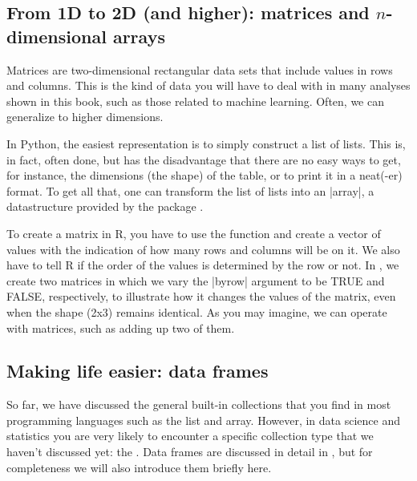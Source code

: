 \subsection{From 1D to 2D (and higher): matrices and $n$-dimensional arrays}

Matrices are two-dimensional rectangular data sets that include values
in rows and columns. This is the kind of data you will have to deal
with in many analyses shown in this book, such as those related to
machine learning. Often, we can generalize to higher dimensions.


In Python, the easiest representation is to simply construct a list of
lists. This is, in fact, often done, but has the disadvantage that
there are no easy ways to get, for instance, the dimensions (the
shape) of the table, or to print it in a neat(-er) format. To get all
that, one can transform the list of lists into an |array|, a
datastructure provided by the package .

To create a matrix in R, you have to use the function  and
create a vector of values with the indication of how many rows and
columns will be on it. We also have to tell R if the order of the
values is determined by the row or not. In , we create
two matrices in which we vary the |byrow| argument to be TRUE and
FALSE, respectively, to illustrate how it changes the values of the
matrix, even when the shape (2x3) remains identical. As you may
imagine, we can operate with matrices, such as adding up two of them.



\subsection{Making life easier: data frames}

So far, we have discussed the general built-in collections that you find in most programming languages
such as the list and array.
However, in data science and statistics you are very likely to encounter a specific collection type that we haven't discussed yet: the .
Data frames are discussed in detail in ,
but for completeness we will also introduce them briefly here. 

